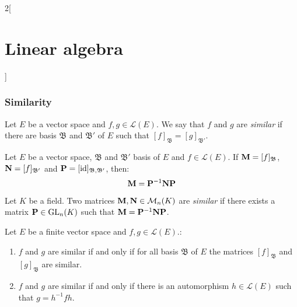 \documentclass[../../../main.tex]{subfiles}
\begin{document}
\begin{multicols}{2}[\section{Linear algebra}]
\subsubsection*{Similarity}
\begin{definition}
    Let $E$ be a vector space and $f,g\in\mathcal{L}(E)$. We say that $f$ and $g$ are \textit{similar} if there are basis $\mathfrak{B}$ and $\mathfrak{B}'$ of $E$ such that $[f]_\mathfrak{B}=[g]_{\mathfrak{B}'}$.
\end{definition}
\begin{lemma}
    Let $E$ be a vector space, $\mathfrak{B}$ and $\mathfrak{B}'$ basis of $E$ and $f\in\mathcal{L}(E)$. If $\vb{M}=[f]_\mathfrak{B}$, $\vb{N}=[f]_{\mathfrak{B}'}$ and $\vb{P}=[\mathrm{id}]_{\mathfrak{B},\mathfrak{B}'}$, then: $$\vb{M}=\vb{P}^{-1}\vb{N}\vb{P}$$
\end{lemma}
\begin{definition}
    Let $K$ be a field. Two matrices $\vb{M},\vb{N}\in\mathcal{M}_n(K)$ are \textit{similar} if there exists a matrix $\vb{P}\in\mathrm{GL}_n(K)$ such that $\vb{M}=\vb{P}^{-1}\vb{N}\vb{P}$.
\end{definition}
\begin{prop}
    Let $E$ be a finite vector space and $f,g\in\mathcal{L}(E)$.:
    \begin{enumerate}
        \item $f$ and $g$ are similar if and only if for all basis $\mathfrak{B}$ of $E$ the matrices $[f]_\mathfrak{B}$ and $[g]_\mathfrak{B}$ are similar.
        \item $f$ and $g$ are similar if and only if there is an automorphism $h\in\mathcal{L}(E)$ such that $g=h^{-1}fh$.
    \end{enumerate}
\end{prop}

\end{multicols}
\end{document}
